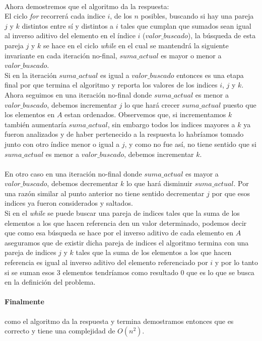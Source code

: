 \documentclass[12pt]{article}
\begin{document}
\paragraph{}Ahora demostremos que el algoritmo da la respuesta:\\
El ciclo \textit{for} recorrerá cada indice $i$, de los $n$ posibles, buscando si hay una pareja $j$ y $k$ distintos entre sí y distintos a $i$ tales que cumplan que sumados sean igual al inverso aditivo del elemento en el índice $i$ ($valor\_buscado$), la búsqueda de esta pareja $j$ y $k$ se hace en el ciclo \textit{while} en el cual se mantendrá la siguiente invariante en cada iteración no-final, $suma\_actual$ es mayor o menor a $valor\_buscado$.\\
Si en la iteración $suma\_actual$ es igual a $valor\_buscado$ entonces es una etapa final por que termina el algoritmo y reporta los valores de los indices $i$, $j$ y $k$.\\
Ahora seguimos en una iteración  no-final donde $suma\_actual$ es menor a $valor\_buscado$, debemos incrementar $j$ lo que hará crecer $suma\_actual$ puesto que los elementos en $A$ estan ordenados. Observemos que, si incrementamos $k$ también aumentaría  $suma\_actual$, sin embargo todos los indices mayores a $k$ ya fueron analizados y de haber pertenecido a la respuesta lo habríamos tomado junto con otro índice menor o igual a $j$, y como no fue así, no tiene sentido que si $suma\_actual$ es menor a $valor\_buscado$, debemos incrementar $k$.
\\
\pagebreak
\\
En otro caso en una iteración  no-final donde $suma\_actual$ es mayor a $valor\_buscado$, debemos decrementar $k$ lo que hará disminuir $suma\_actual$. Por una razón similar al punto anterior no tiene sentido decrementar $j$ por que esos indices ya fueron considerados y saltados.\\
Si en el \textit{while} se puede buscar una pareja de indices tales que la suma de los elementos a los que hacen referencia den un valor determinado, podemos decir que como esa búsqueda se hace por el inverso aditivo de cada elemento en $A$ aseguramos que de existir dicha pareja de indices el algoritmo termina con una pareja de indices $j$ y $k$ tales que la suma de los elementos a los que hacen referencia es igual al inverso aditivo del elemento referenciado por $i$ y por lo tanto si se suman esos 3 elementos tendríamos como resultado $0$ que es lo que se busca en la definición del problema. 
\paragraph{Finalmente} como el algoritmo da la respuesta y termina demostramos entonces que es correcto y tiene una complejidad de $O(n^{2})$.
\end{document}
